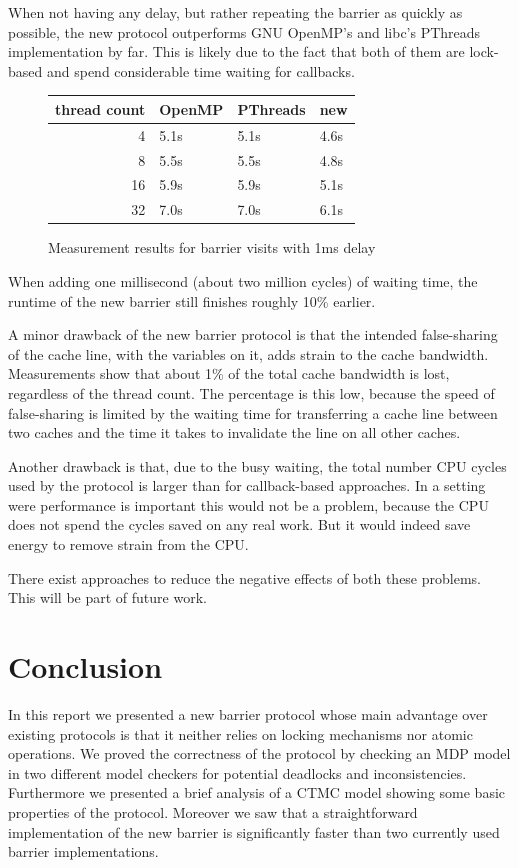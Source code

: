 \documentclass[a4paper, 10pt]{article}
\begin{document}
When not having any delay, but rather repeating the barrier as quickly as possible, the new protocol outperforms GNU OpenMP's and libc's PThreads implementation by far. This is likely due to the fact that both of them are lock-based and spend considerable time waiting for callbacks.

\begin{figure}[htbp]
	\centering
	\begin{tabular}{r | l l l}
		thread count& OpenMP & PThreads & new \\
		\hline
		 4          & 5.1s   & 5.1s     & 4.6s \\
		 8          & 5.5s   & 5.5s     & 4.8s \\
		16          & 5.9s   & 5.9s     & 5.1s \\
		32          & 7.0s   & 7.0s     & 6.1s \\
	\end{tabular}
	\caption{Measurement results for barrier visits with 1ms delay}
	\label{fig:measurement-2}
\end{figure}

When adding one millisecond (about two million cycles) of waiting time, the runtime of the new barrier still finishes roughly 10\% earlier.

A minor drawback of the new barrier protocol is that the intended false-sharing of the cache line, with the variables on it, adds strain to the cache bandwidth. Measurements show that about 1\% of the total cache bandwidth is lost, regardless of the thread count. The percentage is this low, because the speed of false-sharing is limited by the waiting time for transferring a cache line between two caches and the time it takes to invalidate the line on all other caches.

Another drawback is that, due to the busy waiting, the total number CPU cycles used by the protocol is larger than for callback-based approaches. In a setting were performance is important this would not be a problem, because the CPU does not spend the cycles saved on any real work. But it would indeed save energy to remove strain from the CPU.

There exist approaches to reduce the negative effects of both these problems. This will be part of future work.

\section{Conclusion}
In this report we presented a new barrier protocol whose main advantage over existing protocols is that it neither relies on locking mechanisms nor atomic operations.
We proved the correctness of the protocol by checking an MDP model in two different model checkers for potential deadlocks and inconsistencies.
Furthermore we presented a brief analysis of a CTMC model showing some basic properties of the protocol.
Moreover we saw that a straightforward implementation of the new barrier is significantly faster than two currently used barrier implementations.
\end{document}
